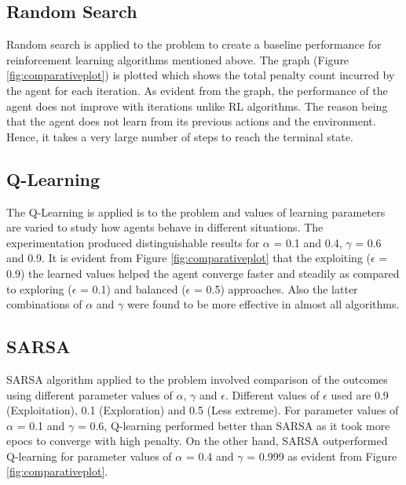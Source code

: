 \documentclass{svproc}
\begin{document}
\subsection{Random Search}
Random search is applied to the problem to create a baseline performance for reinforcement learning algorithms mentioned above. The graph (Figure \ref{fig:comparativeplot}) is plotted which shows the total penalty count incurred by the agent for each iteration. As evident from the graph, the performance of the agent does not improve with iterations unlike RL algorithms. The reason being that the agent does not learn from its previous actions and the environment. Hence, it takes a very large number of steps to reach the terminal state.

\subsection{Q-Learning}
The Q-Learning is applied is to the problem and values of learning parameters are varied to study how agents behave in different situations. The experimentation produced distinguishable results for $\alpha$ = 0.1 and 0.4, $\gamma$ = 0.6 and 0.9. It is evident from Figure \ref{fig:comparativeplot} that the exploiting ($\epsilon$ = 0.9) the learned values helped the agent converge faster and steadily as compared to exploring ($\epsilon$ = 0.1) and balanced ($\epsilon$ = 0.5) approaches. Also the latter combinations of $\alpha$ and $\gamma$ were found to be more effective in almost all algorithms.

\subsection {SARSA}
SARSA algorithm applied to the problem involved comparison of the outcomes using different parameter values of $\alpha$, $\gamma$ and $\epsilon$. Different values of $\epsilon$ used are 0.9 (Exploitation), 0.1 (Exploration) and 0.5 (Less extreme). For parameter values of $\alpha$ = 0.1 and $\gamma$ = 0.6, Q-learning performed better than SARSA as it took more epocs to converge with high penalty. On the other hand, SARSA outperformed Q-learning for parameter values of $\alpha$ = 0.4 and $\gamma$ = 0.999 as evident from Figure \ref{fig:comparativeplot}.
\end{document}
